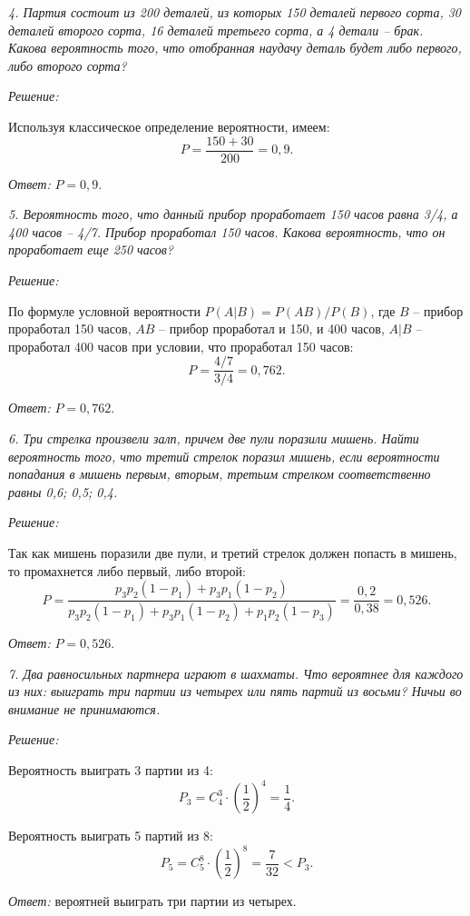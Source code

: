 \vspace*{2em}

\emph{4. Партия состоит из 200 деталей, из которых 150 деталей первого сорта, 30
деталей второго сорта, 16 деталей третьего сорта, а 4 детали -- брак. Какова
вероятность того, что отобранная наудачу деталь будет либо первого, либо второго
сорта?} 

\vspace*{2em}
\emph{Решение:}

Используя классическое определение вероятности, имеем:
\[
    P = \frac{150 + 30}{200} = 0,9.
\]

\vspace*{2em}
\emph{Ответ:} \( P = 0,9 \).

\pagebreak

\emph{5. Вероятность того, что данный прибор проработает 150 часов равна 3/4, а 400
часов -- 4/7. Прибор проработал 150 часов. Какова вероятность, что он
проработает еще 250 часов?}

\vspace*{2em}
\emph{Решение:}

По формуле условной вероятности \( P(A|B) = P(AB)/P(B) \), где \( B \) --
прибор проработал 150 часов, \( AB \) -- прибор проработал и 150, и 400 часов,
\( A|B \) -- проработал 400 часов при условии, что проработал 150 часов:
\[
    P = \frac{4/7}{3/4} = 0,762.
\]

\vspace*{2em}
\emph{Ответ:} \( P = 0,762 \).

\vspace*{2em}

\emph{6. Три стрелка произвели залп, причем две пули поразили мишень. Найти вероятность
того, что третий стрелок поразил мишень, если вероятности попадания в мишень
первым, вторым, третьим стрелком соответственно равны 0,6; 0,5; 0,4.}

\vspace*{2em}
\emph{Решение:}

Так как мишень поразили две пули, и третий стрелок должен попасть в мишень, то
промахнется либо первый, либо второй:
\[
    P = \frac{p_3p_2(1-p_1) + p_3p_1(1-p_2)}{p_3p_2(1-p_1) + p_3p_1(1-p_2) +
    p_1p_2(1-p_3)} = \frac{0,2}{0,38} = 0,526.
\]

\vspace*{2em}
\emph{Ответ:} \( P = 0,526 \).

\pagebreak

\emph{7. Два равносильных партнера играют в шахматы. Что вероятнее для каждого из
них: выиграть три партии из четырех или пять партий из восьми? Ничьи во внимание
не принимаются.}

\vspace*{2em}
\emph{Решение:}

Вероятность выиграть 3 партии из 4:
\[
    P_3 = C_4^3 \cdot \left(\frac{1}{2}\right)^4 = \frac{1}{4}.
\]

Вероятность выиграть 5 партий из 8:
\[
    P_5 = C_5^8 \cdot \left(\frac{1}{2}\right)^8 = \frac{7}{32} < P_3.
\]

\vspace*{2em}
\emph{Ответ:} вероятней выиграть три партии из четырех.
